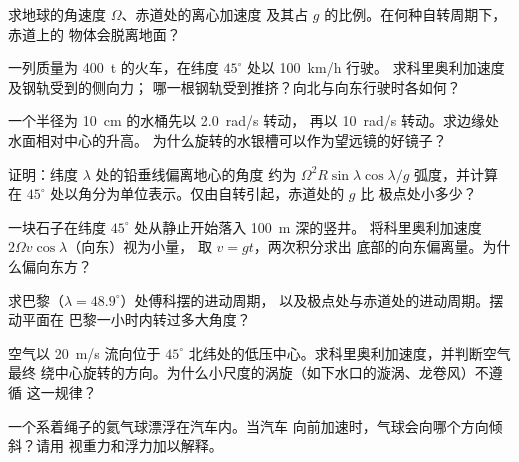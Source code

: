 \begin{exercise}[$\star$]\label{exo:b1:non-inertial-frames:3}
求地球的角速度 $\Omega$、赤道处的离心加速度
及其占 $g$ 的比例。在何种自转周期下，赤道上的
物体会脱离地面？
\end{exercise}

\begin{exercise}[$\star$]\label{exo:b1:non-inertial-frames:4}
一列质量为 \qty{400}{t} 的火车，在纬度 $45^\circ$ 处以 \qty{100}{km/h} 行驶。
求科里奥利加速度及钢轨受到的侧向力；
哪一根钢轨受到推挤？向北与向东行驶时各如何？
\end{exercise}

\begin{exercise}[$\star\star$]\label{exo:b1:non-inertial-frames:5}
一个半径为 \qty{10}{cm} 的水桶先以 \qty{2.0}{rad/s} 转动，
再以 \qty{10}{rad/s} 转动。求边缘处水面相对中心的升高。
为什么旋转的水银槽可以作为望远镜的好镜子？
\end{exercise}

\begin{exercise}[$\star\star$]\label{exo:b1:non-inertial-frames:6}
证明：纬度 $\lambda$ 处的铅垂线偏离地心的角度
约为 $\Omega^2R\sin\lambda\cos\lambda/g$ 弧度，并计算
在 $45^\circ$ 处以角分为单位表示。仅由自转引起，赤道处的 $g$ 比
极点处小多少？
\end{exercise}

\begin{exercise}[$\star\star$]\label{exo:b1:non-inertial-frames:7}
一块石子在纬度 $45^\circ$ 处从静止开始落入 \qty{100}{m} 深的竖井。
将科里奥利加速度 $2\Omega v\cos\lambda$（向东）视为小量，
取 $v = gt$，两次积分求出
底部的向东偏离量。为什么偏向东方？
\end{exercise}

\begin{exercise}[$\star\star$]\label{exo:b1:non-inertial-frames:8}
求巴黎（$\lambda = 48.9^\circ$）处傅科摆的进动周期，
以及极点处与赤道处的进动周期。摆动平面在
巴黎一小时内转过多大角度？
\end{exercise}

\begin{exercise}[$\star\star$]\label{exo:b1:non-inertial-frames:9}
空气以 \qty{20}{m/s} 流向位于 $45^\circ$
北纬处的低压中心。求科里奥利加速度，并判断空气最终
绕中心旋转的方向。为什么小尺度的涡旋（如下水口的漩涡、龙卷风）不遵循
这一规律？
\end{exercise}

\begin{exercise}[$\star\star\star$]\label{exo:b1:non-inertial-frames:10}
一个系着绳子的氦气球漂浮在汽车内。当汽车
向前加速时，气球会向哪个方向倾斜？请用
视重力和浮力加以解释。
\end{exercise}


